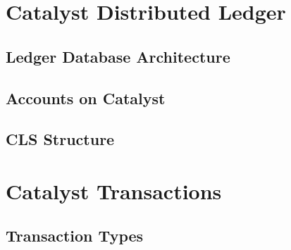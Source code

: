 \documentclass[a4paper, 12pt]{book}
\begin{document}

\chapter{Catalyst Distributed Ledger} \label{Cha:LDA}


\section{Ledger Database Architecture} \label{Sec:LDA}



\section{Accounts on Catalyst} \label{Sec:AoC}



\section{CLS Structure}\label{SecLCS}


	

%


\chapter{Catalyst Transactions} \label{Cha:Tra}




\section{Transaction Types} \label{Sec:Typ}


\end{document}
